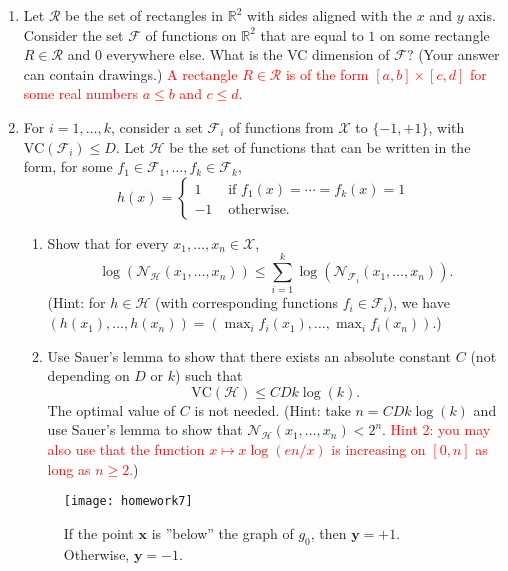 \documentclass[12pt]{article}
\renewcommand{\b}[1]{\mathbf{#1 }}
\newcommand{\VC}{\mathrm{VC}}
\newcommand{\R}{\mathbb{R}}
\newcommand{\FF}{\mathcal{F}}
\newcommand{\HH}{\mathcal{H}}
\newcommand{\NN}{\mathcal{N}}
\newcommand{\RR}{\mathcal{R}}
\newcommand{\XX}{\mathcal{X}}
\begin{document}
\begin{enumerate}
\item Let $\RR$ be the set of rectangles in $\R^2$ with sides aligned with  the $x$ and $y$ axis. Consider the set $\FF$ of functions on $\R^2$ that are equal to $1$ on some rectangle $R\in \RR$ and $0$ everywhere else. What is the VC dimension of $\FF$? (Your answer can contain drawings.) \textcolor{red}{A rectangle $R\in\RR$ is of the form $[a,b]\times[c,d]$ for some real numbers $a\leq b$ and $c\leq d$.}
\item For $i=1,\dots,k$, consider a set $\FF_i$ of functions from $\XX$ to $\{-1,+1\}$, with $\VC(\FF_i) \leq D$. Let $\HH$ be the set of functions that can be written in the form, for some $f_1\in\FF_1,\dots, f_k\in \FF_k$,
\[
h(x)=
\begin{cases}
1 &\text{ if } f_1(x)=\cdots =f_k(x)=1\\
-1 &\text{ otherwise.}
\end{cases}
\]
\begin{enumerate}
\item Show that for every $x_1,\dots,x_n\in \XX$,
\[ \log(\NN_{\HH}(x_1,\dots,x_n)) \leq \sum_{i=1}^k \log(\NN_{\FF_i}(x_1,\dots,x_n)).\]
(Hint: for $h\in \HH$ (with corresponding functions $f_i\in \FF_i$), we have $(h(x_1),\dots,h(x_n)) = (\max_i f_i(x_1),\dots,\max_i f_i(x_n))$.)
\item Use Sauer's lemma to show that there exists an absolute constant $C$ (not depending on $D$ or $k$) such that
\[ \VC(\HH) \leq C D k \log(k).\]
The optimal value of $C$ is not needed.
(Hint: take $n=CDk\log(k)$ and use Sauer's lemma to show that $\NN_{\HH}(x_1,\dots,x_n) < 2^n$. \textcolor{red}{Hint 2: you may also use that the function $x\mapsto x\log(en/x)$ is increasing on $[0,n]$ as long as $n\geq 2$.})
\end{enumerate}


\begin{figure}\label{fig:hw}
\centering
\texttt{[image: homework7]}
\caption{If the point $\b{x}$ is ''below'' the graph of $g_0$, then $\b{y}=+1$. Otherwise, $\b{y}=-1$.}
\end{figure}


\end{enumerate}
\end{document}

